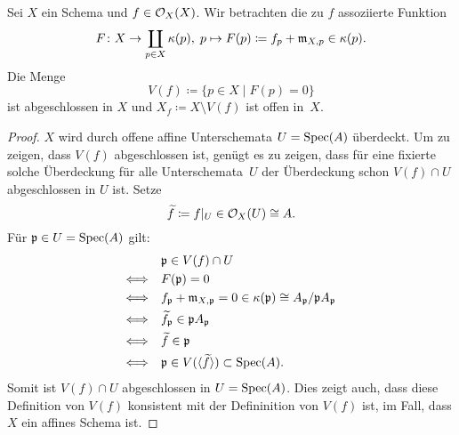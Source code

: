 \begin{lem}
\label{lem:6.4}
	Sei $X$ ein Schema und $f \in \mathcal{O}_X(X)$. Wir betrachten die zu $f$ assoziierte Funktion
	\[
		F\colon X \to \coprod_{p \in X}\kappa(p),\; p \mapsto F(p)\coloneqq f_p+\mathfrak{m}_{X,p}\in \kappa(p).
	\]
	Die Menge 
	\[
		V(f) \coloneqq \{p\in X\mid F(p) = 0\}
	\]
	ist abgeschlossen in $X$ und $X_f\coloneqq X \setminus V(f)$ ist offen in~$X$.
	\begin{proof}
		$X$ wird durch offene affine Unterschemata $U=\operatorname{Spec}(A)$ überdeckt. Um zu zeigen, dass $V(f)$ abgeschlossen ist, genügt es zu zeigen, dass für eine fixierte solche Überdeckung für alle Unterschemata~$U$ der Überdeckung schon $V(f)\cap U$ abgeschlossen in $U$ ist. Setze
		\[
			\widetilde{f}\coloneqq f\vert_U\in \mathcal{O}_X(U) \cong A.
		\]
		Für $\mathfrak{p}\in U = \operatorname{Spec}(A)$ gilt:
		\begin{align*}
			&\mathfrak{p} \in V(f) \cap U\\
			\Longleftrightarrow \quad & F(\mathfrak{p})=0\\
			\Longleftrightarrow \quad & f_{\mathfrak{p}}+\mathfrak{m}_{X,\mathfrak{p}} = 0 \in \kappa(\mathfrak{p}) \cong A_{\mathfrak{p}}/\mathfrak{p} A_{\mathfrak{p}}\\
			\Longleftrightarrow \quad & \widetilde{f}_{\mathfrak{p}} \in \mathfrak{p} A_{\mathfrak{p}}\\
			\Longleftrightarrow \quad & \widetilde{f} \in \mathfrak{p}\\
			\Longleftrightarrow \quad & \mathfrak{p} \in V(\langle \widetilde{f} \rangle) \subset \operatorname{Spec}(A) .
		\end{align*}
		Somit ist $V(f)\cap U$ abgeschlossen in $U = \operatorname{Spec}(A)$. Dies zeigt auch, dass diese Definition von $V(f)$ konsistent mit der Defininition von $V(f)$ ist, im Fall, dass $X$ ein affines Schema ist.
	\end{proof}
\end{lem}

